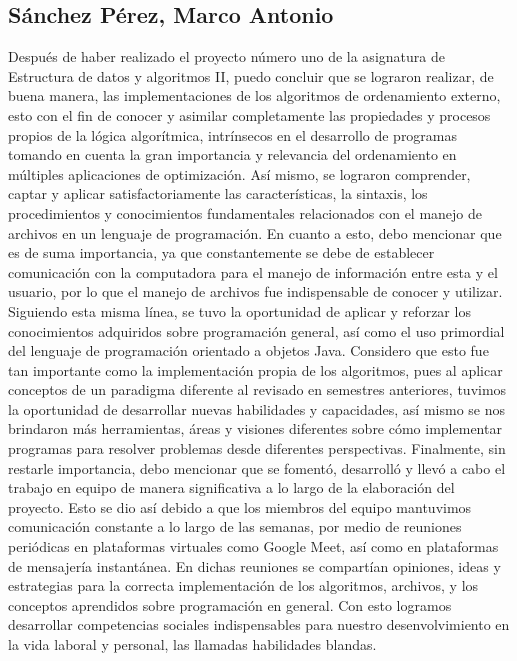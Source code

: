 \documentclass[11pt]{article}
\begin{document}
\subsection{Sánchez Pérez, Marco Antonio}
\par
Después de haber realizado el proyecto número uno de la asignatura de Estructura de datos y algoritmos II, puedo concluir que se lograron realizar, de buena manera, las implementaciones de los algoritmos de ordenamiento externo, esto con el fin de conocer y asimilar completamente las propiedades y procesos propios de la lógica algorítmica, intrínsecos en el desarrollo de programas tomando en cuenta la gran importancia y relevancia del ordenamiento en múltiples aplicaciones de optimización. Así mismo, se lograron comprender, captar y aplicar satisfactoriamente las características, la sintaxis, los procedimientos y conocimientos fundamentales relacionados con el manejo de archivos en un lenguaje de programación. En cuanto a esto, debo mencionar que es de suma importancia, ya que constantemente se debe de establecer comunicación con la computadora para el manejo de información entre esta y el usuario, por lo que el manejo de archivos fue indispensable de conocer y utilizar. Siguiendo esta misma línea, se tuvo la oportunidad de aplicar y reforzar los conocimientos adquiridos sobre programación general, así como el uso primordial del lenguaje de programación orientado a objetos Java. Considero que esto fue tan importante como la implementación propia de los algoritmos, pues al aplicar conceptos de un paradigma diferente al revisado en semestres anteriores, tuvimos la oportunidad de desarrollar nuevas habilidades y capacidades, así mismo se nos brindaron más herramientas, áreas y visiones diferentes sobre cómo implementar programas para resolver problemas desde diferentes perspectivas. Finalmente, sin restarle importancia, debo mencionar que se fomentó, desarrolló y llevó a cabo el trabajo en equipo de manera significativa a lo largo de la elaboración del proyecto. Esto se dio así debido a que los miembros del equipo mantuvimos comunicación constante a lo largo de las semanas, por medio de reuniones periódicas en plataformas virtuales como Google Meet, así como en plataformas de mensajería instantánea. En dichas reuniones se compartían opiniones, ideas y estrategias para la correcta implementación de los algoritmos, archivos, y los conceptos aprendidos sobre programación en general. Con esto logramos desarrollar competencias sociales indispensables para nuestro desenvolvimiento en la vida laboral y personal, las llamadas habilidades blandas.
\end{document}
